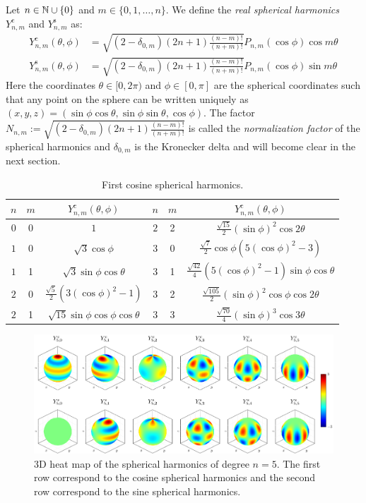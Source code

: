 \documentclass[../main.tex]{subfiles}
\begin{document}
\begin{definition}
  Let $n\in\mathbb{N}\cup\{0\}$ and $m\in\{0,1,\dots,n\}$. We define the \emph{real spherical harmonics} $Y_{n,m}^{\mathrm{c}}$ and $Y_{n,m}^{\mathrm{s}}$ as:
  \begin{align}
    Y_{n,m}^{\mathrm{c}}(\theta,\phi) & =\sqrt{(2-\delta_{0,m})(2n+1)\frac{(n-m)!}{(n+m)!} }P_{n,m}(\cos\phi) \cos{m\theta} \\
    Y_{n,m}^{\mathrm{s}}(\theta,\phi) & =\sqrt{(2-\delta_{0,m})(2n+1)\frac{(n-m)!}{(n+m)!} }P_{n,m}(\cos\phi) \sin{m\theta}
  \end{align}
  Here the coordinates $\theta\in [0,2\pi)$ and $\phi\in[0,\pi]$ are the spherical coordinates such that any point on the sphere can be written uniquely as $(x,y,z) = (\sin\phi\cos\theta,\sin\phi\sin\theta,\cos\phi)$. The factor $N_{n,m}:=\sqrt{(2-\delta_{0,m})(2n+1)\frac{(n-m)!}{(n+m)!} }$ is called the \emph{normalization factor} of the spherical harmonics and $\delta_{0,m}$ is the Kronecker delta and will become clear in the next section.
\end{definition}
\begin{table}[ht]
  \centering
  \begin{tabular}{|c|c|c||c|c|c|}
    \hline
    $n$ & $m$ & $Y_{n,m}^{\mathrm{c}}(\theta,\phi)$     & $n$ & $m$ & $Y_{n,m}^{\mathrm{c}}(\theta,\phi)$                        \\
    \hline
    $0$ & 0   & $1$                                     & $2$ & 2   & $\frac{\sqrt{15}}{2}{(\sin\phi)}^2\cos 2\theta$            \\
    $1$ & 0   & $\sqrt{3}\cos\phi$                      & $3$ & 0   & $\frac{\sqrt{7}}{2}\cos\phi(5{(\cos\phi)}^2-3)$            \\
    $1$ & 1   & $\sqrt{3}\sin\phi\cos\theta$            & $3$ & 1   & $\frac{\sqrt{42}}{4}(5{(\cos\phi)}^2-1)\sin\phi\cos\theta$ \\
    $2$ & 0   & $\frac{\sqrt{5}}{2}(3{(\cos\phi)}^2-1)$ & $3$ & 2   & $\frac{\sqrt{105}}{2}{(\sin\phi)}^2\cos\phi\cos 2\theta$   \\
    $2$ & 1   & $\sqrt{15}\sin\phi\cos\phi\cos\theta$   & $3$ & 3   & $\frac{\sqrt{70}}{4}{(\sin\phi)}^3\cos 3\theta$            \\
    \hline
  \end{tabular}
  \caption{First cosine spherical harmonics.}
\end{table}
\begin{figure}[ht]
  \centering
  \includegraphics[width=\textwidth]{Images/sphericalHarmonics.pdf}
  \caption{3D heat map of the spherical harmonics of degree $n=5$. The first row correspond to the cosine spherical harmonics and the second row correspond to the sine spherical harmonics.}
\end{figure}
\end{document}
